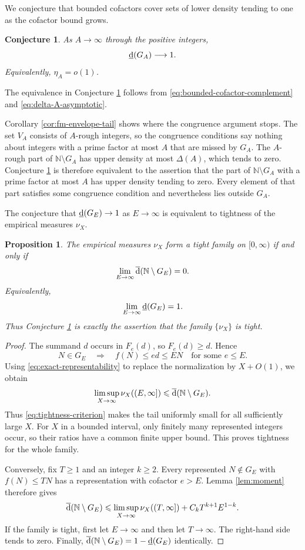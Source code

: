 \documentclass[11pt,letterpaper,reqno]{amsart}
\numberwithin{equation}{section}
\newtheorem{proposition}[theorem]{Proposition}
\newtheorem{conjecture}[theorem]{Conjecture}
\theoremstyle{remark}
\newcommand{\N}{\mathbb{N}}
\newcommand{\lowerdens}{\underline{\textup{d}}}
\newcommand{\upperdens}{\overline{\textup{d}}}
\renewcommand{\leq}{\leqslant}
\renewcommand{\geq}{\geqslant}
\begin{document}
We conjecture that bounded cofactors cover sets of lower density tending to one as the cofactor bound grows.

\begin{conjecture}
\label{conj:bounded-cofactor-weak}
As $A\to\infty$ through the positive integers,
\[
 \lowerdens(G_A)\longrightarrow1.
\]
Equivalently, $\eta_A=o(1)$.
\end{conjecture}

The equivalence in Conjecture \ref{conj:bounded-cofactor-weak} follows from
\eqref{eq:bounded-cofactor-complement} and
\eqref{eq:delta-A-asymptotic}.

Corollary \ref{cor:fm-envelope-tail} shows where the congruence argument
stops. The set $V_A$ consists of $A$-rough integers, so the congruence
conditions say nothing about integers with a prime factor at most $A$
that are missed by $G_A$. The $A$-rough part of $\N\setminus G_A$ has
upper density at most $\Delta(A)$, which tends to zero.
Conjecture \ref{conj:bounded-cofactor-weak} is therefore equivalent to the
assertion that the part of $\N\setminus G_A$ with a prime factor at most
$A$ has upper density tending to zero. Every element of that part satisfies some
congruence condition and nevertheless lies outside $G_A$.

The conjecture that $\lowerdens(G_E)\to1$ as $E\to\infty$ is equivalent to tightness of the empirical measures $\nu_X$.

\begin{proposition}
\label{prop:tightness-equivalence}
The empirical measures $\nu_X$ form a tight family on $[0,\infty)$
if and only if
\begin{equation}\label{eq:tightness-criterion}
 \lim_{E\to\infty}\upperdens(\N\setminus G_E)=0.
\end{equation}
Equivalently,
\[
 \lim_{E\to\infty}\lowerdens(G_E)=1.
\]
Thus Conjecture \ref{conj:bounded-cofactor-weak} is exactly the assertion
that the family $\{\nu_X\}$ is tight.
\end{proposition}

\begin{proof}
The summand $d$ occurs in $F_e(d)$, so $F_e(d)\geq d$. Hence
\[
 N\in G_E\quad\Longrightarrow\quad f(N)\leq ed\leq EN
 \quad\text{for some }e\leq E.
\]
Using \eqref{eq:exact-representability} to replace the normalization by
$X+O(1)$, we obtain
\[
 \limsup_{X\to\infty}\nu_X((E,\infty])
 \leq\upperdens(\N\setminus G_E).
\]
Thus \eqref{eq:tightness-criterion} makes the tail uniformly small for
all sufficiently large $X$. For $X$ in a bounded interval, only finitely
many represented integers occur, so their ratios have a common finite
upper bound. This proves tightness for the whole family.

Conversely, fix $T\geq1$ and an integer $k\geq2$. Every represented
$N\notin G_E$ with $f(N)\leq TN$ has a representation with cofactor $e>E$.
Lemma \ref{lem:moment} therefore gives
\[
 \upperdens(\N\setminus G_E)
 \leq\limsup_{X\to\infty}\nu_X((T,\infty])
 +C_kT^{k+1}E^{1-k}.
\]
If the family is tight, first let $E\to\infty$ and then let $T\to\infty$.
The right-hand side tends to zero. Finally,
$\upperdens(\N\setminus G_E)=1-\lowerdens(G_E)$ identically.
\end{proof}
\end{document}
